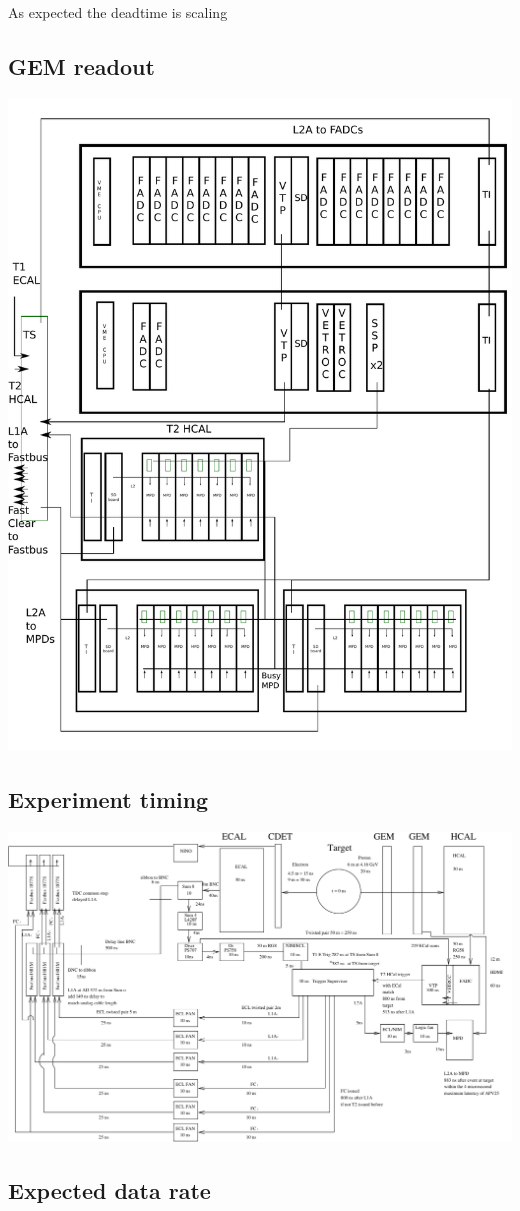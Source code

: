 \documentclass{article}
\begin{document}
As expected the deadtime is scaling

\subsection{GEM readout}
 
 \includegraphics[scale=0.4]{figs/NewMPDDetailed.pdf}

  
 \subsection {Experiment timing}
 \newpage
	\includegraphics[scale=0.8,angle=90]{figs/GeP.pdf}

\subsection{Expected data rate}
        
\end{document}
